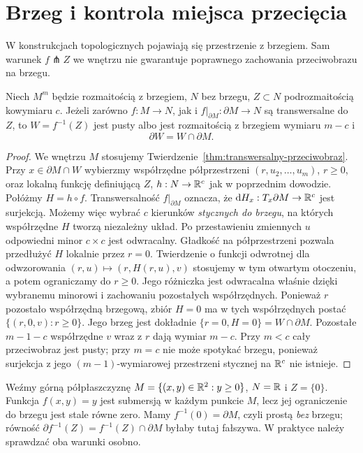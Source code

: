 \section{Brzeg i kontrola miejsca przecięcia}
\label{sec:transwersalnosc-brzeg}

W konstrukcjach topologicznych pojawiają się
przestrzenie z brzegiem. Sam warunek
$f\pitchfork Z$ we wnętrzu nie gwarantuje
poprawnego zachowania przeciwobrazu na brzegu.

\begin{twierdzenie}
\label{thm:transwersalnosc-brzeg}
Niech $M^m$ będzie rozmaitością z brzegiem,
$N$ bez brzegu, $Z\subset N$ podrozmaitością
kowymiaru $c$. Jeżeli zarówno $f:M\to N$,
jak i $f|_{\partial M}:\partial M\to N$
są transwersalne do $Z$, to
$W=f^{-1}(Z)$ jest pusty albo jest rozmaitością z brzegiem
wymiaru $m-c$ i
\[
 \partial W=W\cap\partial M.
\]
\end{twierdzenie}
\begin{proof}
We wnętrzu $M$ stosujemy
Twierdzenie~\ref{thm:transwersalny-przeciwobraz}.
Przy $x\in\partial M\cap W$ wybierzmy współrzędne
półprzestrzeni $(r,u_2,\ldots,u_m)$,
$r\geq0$, oraz lokalną funkcję definiującą
$Z$, $h:N\to\mathbb{R}^c$ jak w poprzednim dowodzie.
Połóżmy $H=h\circ f$. Transwersalność
$f|_{\partial M}$ oznacza, że
$\mathrm d H_x:T_x\partial M\to\mathbb{R}^c$ jest surjekcją.
Możemy więc wybrać $c$ kierunków
\emph{stycznych do brzegu}, na których
współrzędne $H$ tworzą niezależny układ.
Po przestawieniu zmiennych $u$ odpowiedni minor $c\times c$
jest odwracalny. Gładkość na półprzestrzeni pozwala
przedłużyć $H$ lokalnie przez $r=0$. Twierdzenie o funkcji
odwrotnej dla odwzorowania $(r,u)\mapsto(r,H(r,u),v)$ stosujemy
w tym otwartym otoczeniu, a potem ograniczamy do $r\geq0$.
Jego różniczka jest odwracalna właśnie dzięki wybranemu
minorowi i zachowaniu pozostałych współrzędnych.
Ponieważ $r$ pozostało współrzędną brzegową,
zbiór $H=0$ ma w tych współrzędnych postać
$\{(r,0,v):r\geq0\}$. Jego brzeg jest dokładnie
$\{r=0,H=0\}=W\cap\partial M$.
Pozostałe $m-1-c$ współrzędne $v$ wraz z $r$
dają wymiar $m-c$. Przy $m<c$ cały przeciwobraz jest
pusty; przy $m=c$ nie może spotykać brzegu, ponieważ
surjekcja z jego $(m-1)$-wymiarowej przestrzeni stycznej
na $\mathbb{R}^c$ nie istnieje.
\end{proof}

\begin{przyklad}
Weźmy górną półpłaszczyznę
$M=\{(x,y)\in\mathbb{R}^2:y\geq0\}$,
$N=\mathbb{R}$ i $Z=\{0\}$. Funkcja $f(x,y)=y$
jest submersją w każdym punkcie $M$,
lecz jej ograniczenie do brzegu jest stale
równe zero. Mamy $f^{-1}(0)=\partial M$,
czyli prostą \emph{bez} brzegu; równość
$\partial f^{-1}(Z)=f^{-1}(Z)\cap\partial M$
byłaby tutaj fałszywa. W praktyce należy
sprawdzać oba warunki osobno.
\end{przyklad}

